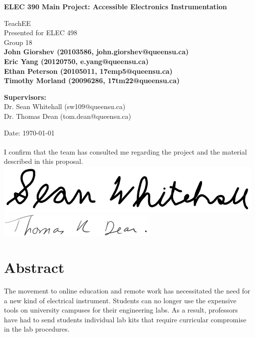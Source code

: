 \documentclass[letterpaper,12pt]{article}
\begin{document}
\begin{titlepage}
    \begin{center}
        \vspace*{1cm}

        \Large
        \textbf{ELEC 390 Main Project: Accessible Electronics Instrumentation}

        \vspace{0.5cm}
        TeachEE\\
        Presented for ELEC 498\\
        Group 18 \\
        \vspace{1.5cm}
        \normalsize
        \textbf{John Giorshev (20103586, john.giorshev@queensu.ca) \\ Eric Yang (20120750, e.yang@queensu.ca) \\ Ethan Peterson (20105011, 17emp5@queensu.ca) \\ Timothy Morland (20096286, 17tm22@queensu.ca)}

        \vfill
            
        \textbf{Supervisors:}\\
        Dr. Sean Whitehall (sw109@queensu.ca) \\
        Dr. Thomas Dean (tom.dean@queensu.ca) \\
            
        \vspace{0.8cm}

        Date: \today \\~\\
        I confirm that the team has consulted me regarding the project and the
        material described in this proposal.\\
        \includegraphics{figures/SWsignature} \\
        \includegraphics{figures/TDsignature} \\
    \end{center}
\end{titlepage}
\section*{Abstract}
The movement to online education and remote work has necessitated the need for a
new kind of electrical instrument. Students can no longer use the expensive
tools on university campuses for their engineering labs. As a result, professors
have had to send students individual lab kits that require curricular compromise
in the lab procedures.\\
\end{document}
